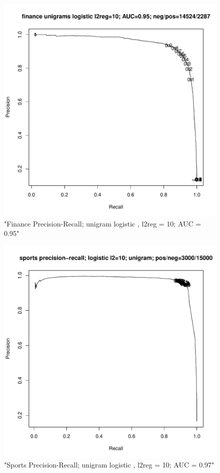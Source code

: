 \begin{figure}[H]
\centering
\includegraphics[scale=0.5]{PRcurve_fin.pdf}
\caption{"Finance Precision-Recall; unigram logistic , l2reg = 10; AUC = 0.95"}
\end{figure}

\begin{figure}[H]
\centering
\includegraphics[scale=0.5]{PRcurve_spt.pdf}
\caption{"Sports Precision-Recall; unigram logistic , l2reg = 10; AUC = 0.97"}
\end{figure}

